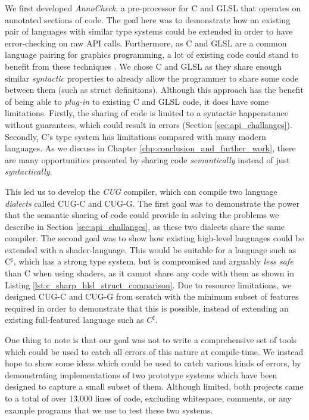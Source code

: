 \documentclass[a4paper,12pt,twoside,openright]{report}
\begin{document}
We first developed \textit{AnnoCheck}, a pre-processor for C and GLSL that
operates on annotated sections of code. The goal here was to demonstrate how an
existing pair of languages with similar type systems could be extended in order
to have error-checking on raw API calls. Furthermore, as C and GLSL are a
common language pairing for graphics programming, a lot of existing code could
stand to benefit from these techniques \cite{TODO}. We chose C and GLSL as they
share enough similar \textit{syntactic} properties to already allow the
programmer to share some code between them (such as struct definitions).
Although this approach has the benefit of being able to \textit{plug-in} to
existing C and GLSL code, it does have some limitations. Firstly, the sharing
of code is limited to a syntactic happenstance without guarantees, which could
result in errors (Section \ref{sec:api_challanges}). Secondly, C's type system
has limitations compared with many modern languages. As we discuss in Chapter
\ref{chp:conclusion_and_further_work}, there are many opportunities presented
by sharing code \textit{semantically} instead of just \textit{syntactically}.


This led us to develop the \textit{CUG} compiler, which can compile two
language \textit{dialects} called CUG-C and CUG-G. The first goal was to
demonstrate the power that the semantic sharing of code could provide in
solving the problems we describe in Section \ref{sec:api_challanges}, as these
two dialects share the same compiler. The second goal was to show how existing
high-level languages could be extended with a shader-language. This would be
suitable for a language such as C$^\sharp$, which has a strong type system, but
is compromised and arguably \textit{less safe} than C when using shaders, as it
cannot share any code with them as shown in Listing
\ref{lst:c_sharp_hlsl_struct_comparison}. Due to resource limitations, we
designed CUG-C and CUG-G from scratch with the minimum subset of features
required in order to demonstrate that this is possible, instead of extending an
existing full-featured language such as $C^\sharp$.

One thing to note is that our goal was not to write a comprehensive set of
tools which could be used to catch all errors of this nature at compile-time.
We instead hope to show some ideas which could be used to catch various kinds
of errors, by demonstrating implementations of two prototype systems which have
been designed to capture a small subset of them. Although limited, both
projects came to a total of over 13,000 lines of code, excluding whitespace,
comments, or any example programs that we use to test these two systems.
\end{document}
